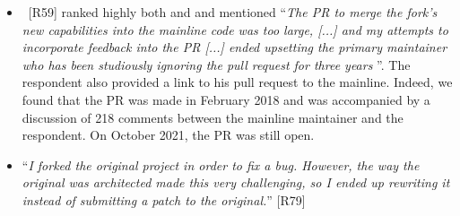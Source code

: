 \begin{itemize}[leftmargin=*]


\item~[R59] ranked highly both  and  and mentioned ``\emph{The PR to merge the fork's new capabilities into the mainline code was too large, [...] %
and my attempts to incorporate feedback into the PR [...] %
ended upsetting the primary maintainer who has been studiously ignoring the pull request for three years \frownie{}}''. 
The respondent also provided a \gh link to his pull request to the mainline. Indeed, we found that the PR was made in February 2018 and was accompanied by a discussion of 218 comments between the mainline maintainer and the respondent. On October 2021, the PR was still open.

\item ``\emph{I forked the original project in order to fix a bug. However, the way the original was architected made this very challenging, so I ended up rewriting it instead of submitting a patch to the original.}'' [R79]


\end{itemize}


